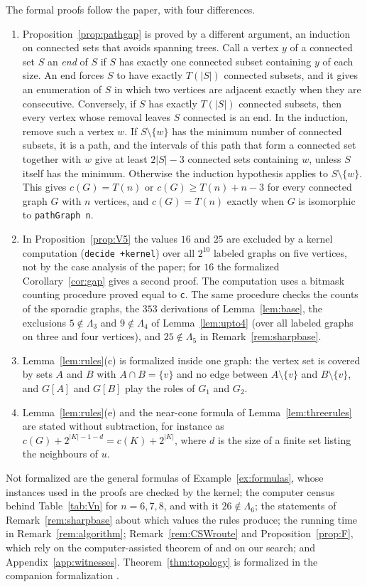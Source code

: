 \documentclass[11pt]{amsart}
\theoremstyle{definition}
\theoremstyle{remark}
\newcommand{\Lam}{\Lambda}
\newcommand{\Tr}[1]{T(#1)}
\begin{document}
The formal proofs follow the paper, with four differences.
\begin{enumerate}[label=\textup{(\arabic*)}]
\item Proposition~\ref{prop:pathgap} is proved by a different argument, an induction on connected sets that avoids spanning trees. Call a vertex $y$ of a connected set $S$ an \emph{end} of $S$ if $S$ has exactly one connected subset containing $y$ of each size. An end forces $S$ to have exactly $\Tr{|S|}$ connected subsets, and it gives an enumeration of $S$ in which two vertices are adjacent exactly when they are consecutive. Conversely, if $S$ has exactly $\Tr{|S|}$ connected subsets, then every vertex whose removal leaves $S$ connected is an end. In the induction, remove such a vertex $w$. If $S\setminus\{w\}$ has the minimum number of connected subsets, it is a path, and the intervals of this path that form a connected set together with $w$ give at least $2|S|-3$ connected sets containing $w$, unless $S$ itself has the minimum. Otherwise the induction hypothesis applies to $S\setminus\{w\}$. This gives $c(G)=\Tr{n}$ or $c(G)\ge\Tr{n}+n-3$ for every connected graph $G$ with $n$ vertices, and $c(G)=\Tr{n}$ exactly when $G$ is isomorphic to \texttt{pathGraph n}.
\item In Proposition~\ref{prop:V5} the values $16$ and $25$ are excluded by a kernel computation (\texttt{decide +kernel}) over all $2^{10}$ labeled graphs on five vertices, not by the case analysis of the paper; for $16$ the formalized Corollary~\ref{cor:gap} gives a second proof. The computation uses a bitmask counting procedure proved equal to \texttt{c}. The same procedure checks the counts of the sporadic graphs, the $353$ derivations of Lemma~\ref{lem:base}, the exclusions $5\notin\Lam_3$ and $9\notin\Lam_4$ of Lemma~\ref{lem:upto4} (over all labeled graphs on three and four vertices), and $25\notin\Lam_5$ in Remark~\ref{rem:sharpbase}.
\item Lemma~\ref{lem:rules}(c) is formalized inside one graph: the vertex set is covered by sets $A$ and $B$ with $A\cap B=\{v\}$ and no edge between $A\setminus\{v\}$ and $B\setminus\{v\}$, and $G[A]$ and $G[B]$ play the roles of $G_1$ and $G_2$.
\item Lemma~\ref{lem:rules}(e) and the near-cone formula of Lemma~\ref{lem:threerules} are stated without subtraction, for instance as $c(G)+2^{|K|-1-d}=c(K)+2^{|K|}$, where $d$ is the size of a finite set listing the neighbours of $u$.
\end{enumerate}
Not formalized are the general formulas of Example~\ref{ex:formulas}, whose instances used in the proofs are checked by the kernel; the computer census behind Table~\ref{tab:Vn} for $n=6,7,8$, and with it $26\notin\Lam_6$; the statements of Remark~\ref{rem:sharpbase} about which values the rules produce; the running time in Remark~\ref{rem:algorithm}; Remark~\ref{rem:CSWroute} and Proposition~\ref{prop:F}, which rely on the computer-assisted theorem of \cite{CSW} and on our search; and Appendix~\ref{app:witnesses}. Theorem~\ref{thm:topology} is formalized in the companion formalization \cite{AA2}.
\end{document}

